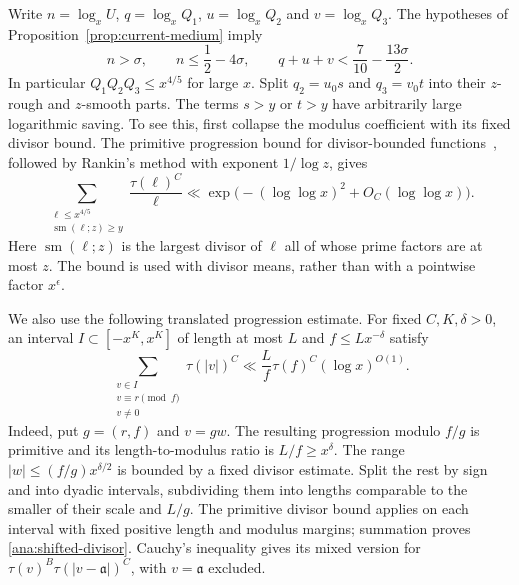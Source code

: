 Write $n=\log_xU$, $q=\log_xQ_1$, $u=\log_xQ_2$ and $v=\log_xQ_3$.
The hypotheses of Proposition~\ref{prop:current-medium} imply
\begin{equation}
 n>\sigma,\qquad n\le\frac12-4\sigma,\qquad
 q+u+v<\frac7{10}-\frac{13\sigma}2.
 \label{ana:lengths}
\end{equation}
In particular $Q_1Q_2Q_3\le x^{4/5}$ for large $x$.
Split $q_2=u_0s$ and $q_3=v_0t$ into their $z$-rough and $z$-smooth
parts. The terms $s>y$ or $t>y$ have arbitrarily large logarithmic
saving. To see this, first collapse the modulus coefficient with its
fixed divisor bound. The primitive progression bound for divisor-bounded
functions~\cite{Shiu}, followed by Rankin's method with exponent $1/\log z$, gives
\begin{equation}
 \sum_{\substack{\ell\le x^{4/5}\\ \operatorname{sm}(\ell;z)\ge y}}
       \frac{\tau(\ell)^C}{\ell}
 \ll \exp\bigl(- (\log\log x)^2+O_C(\log\log x)\bigr).
 \label{ana:smooth-tail}
\end{equation}
Here $\operatorname{sm}(\ell;z)$ is the largest divisor of $\ell$ all of
whose prime factors are at most $z$. The bound is used with divisor
means, rather than with a pointwise factor $x^\epsilon$.

We also use the following translated progression estimate. For fixed
$C,K,\delta>0$, an interval $I\subset[-x^K,x^K]$ of length at most $L$
and $f\le Lx^{-\delta}$ satisfy
\begin{equation}
 \sum_{\substack{v\in I\\v\equiv r\pmod f\\v\ne0}}
        \tau(|v|)^C
       \ll \frac Lf\tau(f)^C(\log x)^{O(1)}.
 \label{ana:shifted-divisor}
\end{equation}
Indeed, put $g=(r,f)$ and $v=gw$. The resulting progression modulo
$f/g$ is primitive and its length-to-modulus ratio is $L/f\ge x^\delta$.
The range $|w|\le(f/g)x^{\delta/2}$ is bounded by a fixed divisor
estimate. Split the rest by sign and into dyadic intervals, subdividing
them into lengths comparable to the smaller of their scale and $L/g$.
The primitive divisor bound applies on each interval with fixed positive
length and modulus margins; summation proves \eqref{ana:shifted-divisor}.
Cauchy's inequality gives its mixed version for
$\tau(v)^B\tau(|v-\mathfrak{a}|)^C$, with $v=\mathfrak{a}$ excluded.

